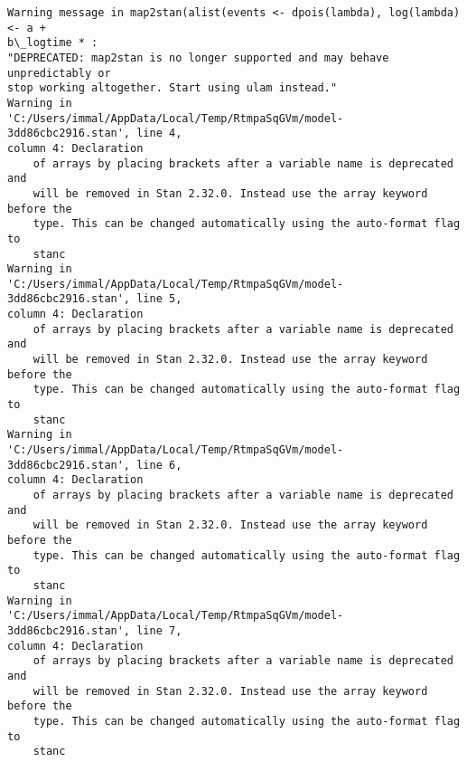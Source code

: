 \documentclass[11pt]{article}
\begin{document}
    \begin{Verbatim}[commandchars=\\\{\}]
Warning message in map2stan(alist(events <- dpois(lambda), log(lambda) <- a +
b\_logtime * :
"DEPRECATED: map2stan is no longer supported and may behave unpredictably or
stop working altogether. Start using ulam instead."
Warning in
'C:/Users/immal/AppData/Local/Temp/RtmpaSqGVm/model-3dd86cbc2916.stan', line 4,
column 4: Declaration
    of arrays by placing brackets after a variable name is deprecated and
    will be removed in Stan 2.32.0. Instead use the array keyword before the
    type. This can be changed automatically using the auto-format flag to
    stanc
Warning in
'C:/Users/immal/AppData/Local/Temp/RtmpaSqGVm/model-3dd86cbc2916.stan', line 5,
column 4: Declaration
    of arrays by placing brackets after a variable name is deprecated and
    will be removed in Stan 2.32.0. Instead use the array keyword before the
    type. This can be changed automatically using the auto-format flag to
    stanc
Warning in
'C:/Users/immal/AppData/Local/Temp/RtmpaSqGVm/model-3dd86cbc2916.stan', line 6,
column 4: Declaration
    of arrays by placing brackets after a variable name is deprecated and
    will be removed in Stan 2.32.0. Instead use the array keyword before the
    type. This can be changed automatically using the auto-format flag to
    stanc
Warning in
'C:/Users/immal/AppData/Local/Temp/RtmpaSqGVm/model-3dd86cbc2916.stan', line 7,
column 4: Declaration
    of arrays by placing brackets after a variable name is deprecated and
    will be removed in Stan 2.32.0. Instead use the array keyword before the
    type. This can be changed automatically using the auto-format flag to
    stanc


    \end{Verbatim}
\end{document}
